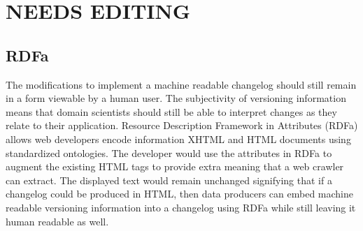 \section{NEEDS EDITING}

\subsection{RDFa}

The modifications to implement a machine readable changelog should still remain in a form viewable by a human user.
The subjectivity of versioning information means that domain scientists should still be able to interpret changes as they relate to their application.
Resource Description Framework in Attributes (RDFa) allows web developers encode information XHTML and HTML documents using standardized ontologies.
The developer would use the attributes in RDFa to augment the existing HTML tags to provide extra meaning that a web crawler can extract.
The displayed text would remain unchanged signifying that if a changelog could be produced in HTML, then data producers can embed machine readable versioning information into a changelog using RDFa while still leaving it human readable as well.


